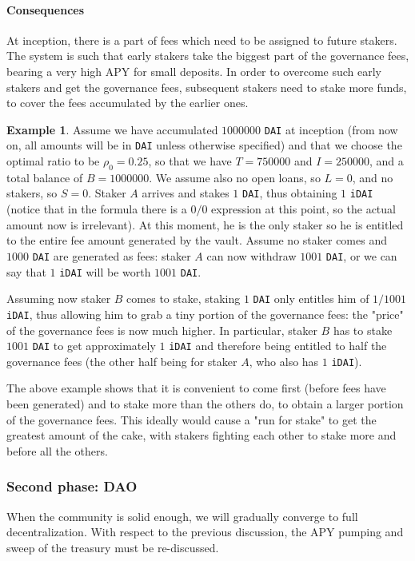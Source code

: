 \documentclass[a4paper,10 pt]{article}
\theoremstyle{definition}
\newtheorem{example}{Example}
\begin{document}
\paragraph{Consequences}
At inception, there is a part of fees which need to be assigned to future stakers. The system is such that early stakers take the biggest part of the governance fees, bearing a very high APY for small deposits. In order to overcome such early stakers and get the governance fees, subsequent stakers need to stake more funds, to cover the fees accumulated by the earlier ones.

\begin{example}
Assume we have accumulated $1000000$ \verb|DAI| at inception (from now on, all amounts will be in \verb|DAI| unless otherwise specified) and that we choose the optimal ratio to be $\rho_0 = 0.25$, so that we have $T = 750000$ and $I = 250000$, and a total balance of $B = 1000000$. We assume also no open loans, so $L = 0$, and no stakers, so $S = 0$.
Staker $A$ arrives and stakes $1$ \verb|DAI|, thus obtaining $1$ \verb|iDAI| (notice that in the formula there is a $0/0$ expression at this point, so the actual amount now is irrelevant). At this moment, he is the only staker so he is entitled to the entire fee amount generated by the vault. Assume no staker comes and $1000$ \verb|DAI| are generated as fees: staker $A$ can now withdraw $1001$ \verb|DAI|, or we can say that $1$ \verb|iDAI| will be worth $1001$ \verb|DAI|.

Assuming now staker $B$ comes to stake, staking $1$ \verb|DAI| only entitles him of $1/1001$ \verb|iDAI|, thus allowing him to grab a tiny portion of the governance fees: the "price" of the governance fees is now much higher. In particular, staker $B$ has to stake $1001$ \verb|DAI| to get approximately $1$ \verb|iDAI| and therefore being entitled to half the governance fees (the other half being for staker $A$, who also has $1$ \verb|iDAI|).
\end{example}

The above example shows that it is convenient to come first (before fees have been generated) and to stake more than the others do, to obtain a larger portion of the governance fees. This ideally would cause a "run for stake" to get the greatest amount of the cake, with stakers fighting each other to stake more and before all the others.

\subsubsection{Second phase: DAO}
When the community is solid enough, we will gradually converge to full decentralization. With respect to the previous discussion, the APY pumping and sweep of the treasury must be re-discussed.
\end{document}
